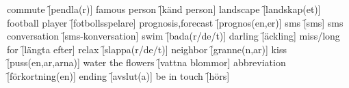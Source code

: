 \begin{questions}
\begin{multicols}{2}
        \question commute \f[pendla(r)]
        \question famous person \f[känd person]
        \question landscape \f[landskap(et)]
        \question football player \f[fotbollsspelare]
        \question prognosis,forecast \f[prognos(en,er)]
        \question sms \f[sms]
        \question sms conversation \f[sms-konversation]
        \question swim \f[bada(r/de/t)]
        \question darling \f[äckling]
        \question miss/long for \f[längta efter]
        \question relax \f[slappa(r/de/t)]
        \question neighbor \f[granne(n,ar)]
        \question kiss \f[puss(en,ar,arna)]
        \question water the flowers \f[vattna blommor]
        \question abbreviation \f[förkortning(en)]
        \question ending \f[avslut(a)]
        \question be in touch \f[hörs]
    \end{multicols}
\end{questions}
